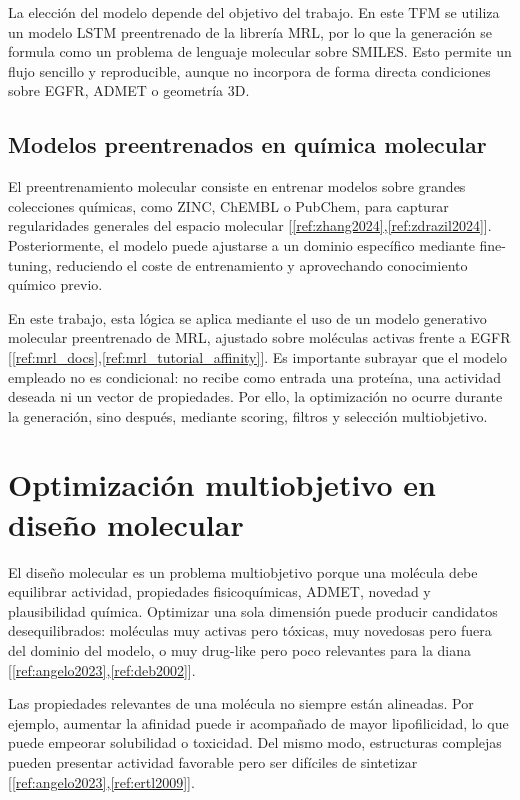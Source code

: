 \documentclass[IB]{TFUOC}%
\begin{document}
La elección del modelo depende del objetivo del trabajo. En este TFM se utiliza un modelo LSTM preentrenado de la librería MRL, por lo que la generación se formula como un problema de lenguaje molecular sobre SMILES. Esto permite un flujo sencillo y reproducible, aunque no incorpora de forma directa condiciones sobre EGFR, ADMET o geometría 3D.

\subsection{Modelos preentrenados en química molecular}

El preentrenamiento molecular consiste en entrenar modelos sobre grandes colecciones químicas, como ZINC, ChEMBL o PubChem, para capturar regularidades generales del espacio molecular [\ref{ref:zhang2024},\ref{ref:zdrazil2024}]. Posteriormente, el modelo puede ajustarse a un dominio específico mediante fine-tuning, reduciendo el coste de entrenamiento y aprovechando conocimiento químico previo.

En este trabajo, esta lógica se aplica mediante el uso de un modelo generativo molecular preentrenado de MRL, ajustado sobre moléculas activas frente a EGFR [\ref{ref:mrl_docs},\ref{ref:mrl_tutorial_affinity}]. Es importante subrayar que el modelo empleado no es condicional: no recibe como entrada una proteína, una actividad deseada ni un vector de propiedades. Por ello, la optimización no ocurre durante la generación, sino después, mediante scoring, filtros y selección multiobjetivo.

\section{Optimización multiobjetivo en diseño molecular}

El diseño molecular es un problema multiobjetivo porque una molécula debe equilibrar actividad, propiedades fisicoquímicas, ADMET, novedad y plausibilidad química. Optimizar una sola dimensión puede producir candidatos desequilibrados: moléculas muy activas pero tóxicas, muy novedosas pero fuera del dominio del modelo, o muy drug-like pero poco relevantes para la diana [\ref{ref:angelo2023},\ref{ref:deb2002}].

Las propiedades relevantes de una molécula no siempre están alineadas. Por ejemplo, aumentar la afinidad puede ir acompañado de mayor lipofilicidad, lo que puede empeorar solubilidad o toxicidad. Del mismo modo, estructuras complejas pueden presentar actividad favorable pero ser difíciles de sintetizar [\ref{ref:angelo2023},\ref{ref:ertl2009}].
\end{document}
